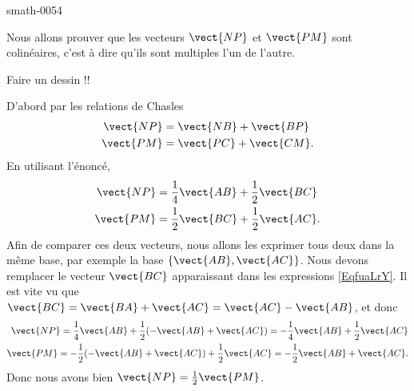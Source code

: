 
\begin{corrige}{smath-0054}

    Nous allons prouver que les vecteurs \( \vect{ NP }\) et \( \vect{ PM }\) sont colinéaires, c'est à dire qu'ils sont multiples l'un de l'autre.
    

    Faire un dessin !!

    D'abord par les relations de Chasles
    \begin{subequations}
        \begin{align}
            \vect{ NP }&=\vect{ NB }+\vect{ BP }\\
            \vect{ PM }&=\vect{ PC }+\vect{ CM }.
        \end{align}
    \end{subequations}
    En utilisant l'énoncé,
    \begin{subequations}        \label{EqfuaLrY}
        \begin{align}
            \vect{ NP }&=\frac{1}{ 4 }\vect{ AB }+\frac{ 1 }{2}\vect{ BC }\\
            \vect{ PM }&=\frac{ 1 }{2}\vect{ BC }+\frac{ 1 }{2}\vect{ AC }.
        \end{align}
    \end{subequations}
    Afin de comparer ces deux vecteurs, nous allons les exprimer tous deux dans la même base, par exemple la base \( \{ \vect{ AB },\vect{ AC } \}\). Nous devons remplacer le vecteur \( \vect{ BC }\) apparaissant dans les expressions \eqref{EqfuaLrY}. Il est vite vu que \( \vect{ BC }=\vect{ BA }+\vect{ AC }=\vect{ AC }-\vect{ AB }\), et donc
    \begin{subequations}
        \begin{align}
            \vect{ NP }=\frac{1}{ 4 }\vect{ AB }+\frac{ 1 }{2}(-\vect{ AB }+\vect{ AC })=-\frac{1}{ 4 }\vect{ AB }+\frac{ 1 }{2}\vect{ AC }\\
            \vect{ PM }=-\frac{ 1 }{2}(-\vect{ AB }+\vect{ AC })+\frac{ 1 }{2}\vect{ AC }=-\frac{ 1 }{2}\vect{ AB }+\vect{ AC }.
        \end{align}
    \end{subequations}
    Donc nous avons bien \( \vect{ NP }=\frac{ 1 }{2}\vect{ PM }\).
    

\end{corrige}
